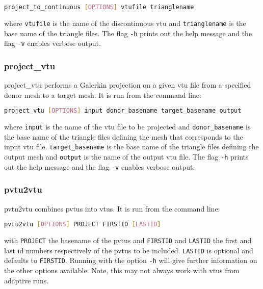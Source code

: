 \begin{lstlisting}[language = Bash]
project_to_continuous [OPTIONS] vtufile trianglename
\end{lstlisting}

where \lstinline[language = Bash]+vtufile+ is the name of the discontinuous vtu and \lstinline[language = Bash]+trianglename+ is the base name of the triangle files. The flag \lstinline[language = Bash]+-h+ prints out the help message and the flag \lstinline[language = Bash]+-v+ enables verbose output.



\subsubsection{project\_vtu}
\label{sec:project_vtu}
project\_vtu performs a Galerkin projection on a given vtu file from a specified donor mesh to a target mesh. It is run from the command line:

\begin{lstlisting}[language = Bash]
project_vtu [OPTIONS] input donor_basename target_basename output
\end{lstlisting}

where \lstinline[language = Bash]+input+ is the name of the vtu file to be projected and \lstinline[language = Bash]+donor_basename+ is the base name of the triangle files defining the mesh that corresponds to the input vtu file. 
\lstinline[language = Bash]+target_basename+ is the base name of the triangle files defining the output mesh and \lstinline[language = Bash]+output+ is the name of the output vtu file.
The flag \lstinline[language = Bash]+-h+ prints out the help message and the flag \lstinline[language = Bash]+-v+ enables verbose output.



\subsubsection{pvtu2vtu}
\label{sec:pvtu2vtu}
pvtu2vtu combines pvtus into vtus. It is run from the command line:
\begin{lstlisting}[language = Bash]
pvtu2vtu [OPTIONS] PROJECT FIRSTID [LASTID]
\end{lstlisting} 
with \lstinline[language = Bash]+PROJECT+ the basename of the pvtus and \lstinline[language = Bash]+FIRSTID+ and \lstinline[language = Bash]+LASTID+ the first and last id numbers respectively of the pvtus to be included. \lstinline[language = Bash]+LASTID+ is optional and defaults to \lstinline[language = Bash]+FIRSTID+. Running with the option \lstinline[language = Bash]+-h+ will give further information on the other options available. Note, this may not always work with vtus from adaptive runs.

